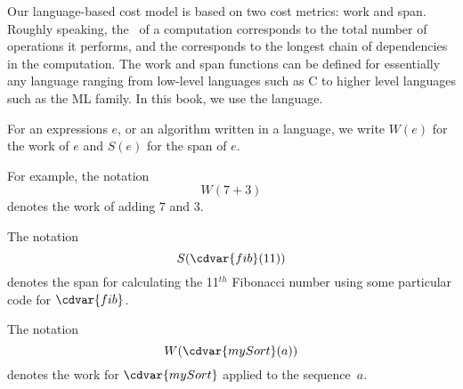 \begin{cluster}
\label{grp:grm:analysis::models::language-based}

\begin{gram}
\label{grm:analysis::models::language-based}
Our language-based cost model is based on two cost metrics: work and
span.  Roughly speaking, the~ of a computation corresponds to
the total number of operations it performs, and the  corresponds
to the longest chain of dependencies in the computation.
The work and span functions can be defined for essentially any
language ranging from low-level languages such as C to higher level
languages such as the ML family.  
In this book, we use the \PML{} language. 

\end{gram}
\end{cluster}

\begin{cluster}
\label{grp:grm:analysis::models::notation-for-work-and-span}

\begin{gram}
\label{grm:analysis::models::notation-for-work-and-span}
For an expressions $e$, or an algorithm written in a language, we write 
$W(e)$ for the work of $e$ and $S(e)$ for the span of $e$.

\end{gram}
\end{cluster}

\begin{cluster}
\label{grp:xmpl:analysis::models::notation}

\begin{example}
\label{xmpl:analysis::models::notation}
For example, 
the notation
\[
W(7 + 3)
\]
denotes the work of adding $7$ and $3$.

The notation 
\[
S(\cdvar{fib}(11))
\]
denotes the span for calculating the 11$^{th}$ Fibonacci number using
some particular code for $\cdvar{fib}$.

The notation 
\[
W(\cdvar{mySort}(a))
\]
denotes the work for $\cdvar{mySort}$ applied to the sequence~$a$.

\end{example}
\end{cluster}

